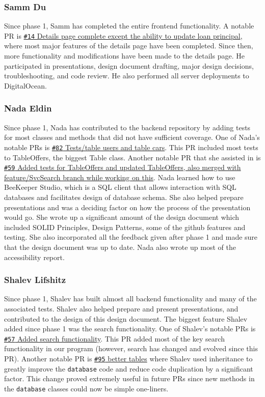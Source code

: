 \documentclass[fontsize=14pt]{article}
\def\code#1{\texttt{#1}}
\begin{document}
\subsubsection*{Samm Du}
Since phase 1, Samm has completed the entire frontend functionality. A notable PR is {\color{blue} \href{https://github.com/TLI-Group-1/Frontend/pull/14/}{\code{\#14} Details page complete except the ability to update loan principal}}, where most major features of the details page have been completed. Since then, more functionality and modifications have been made to the details page. He participated in presentations, design document drafting, major design decisions, troubleshooting, and code review. He also performed all server deployments to DigitalOcean.

\subsubsection*{Nada Eldin}
Since phase 1, Nada has contributed to the backend repository by adding tests for most classes and methods that did not have sufficient coverage. One of Nada's notable PRs is {\color{blue}\href{https://github.com/TLI-Group-1/Backend/pull/82}{\code{\#82} Tests/table users and table cars}}. This PR included most tests to TableOffers, the biggest Table class.
Another notable PR that she assisted in is {\color{blue}\href{https://github.com/TLI-Group-1/Backend/pull/59}{\code{\#59} Added tests for TableOffers and updated TableOffers, also merged with feature/SvcSearch branch while working on this}}.
Nada learned how to use BeeKeeper Studio, which is a SQL client that allows interaction with SQL databases and facilitates design of database schema. 
She also helped prepare presentations and was a deciding factor on how the process of the presentation would go. She wrote up a significant amount of the design document which included SOLID Principles, Design Patterns, some of the github features and testing. She also incorporated all the feedback given after phase 1 and made sure that the design document was up to date. Nada also wrote up most of the accessibility report.

\subsubsection*{Shalev Lifshitz}
Since phase 1, Shalev has built almost all backend functionality and many of the associated tests. Shalev also helped prepare and present presentations, and contributed to the design of this design document. The biggest feature Shalev added since phase 1 was the search functionality. One of Shalev's notable PRs is {\color{blue}\href{https://github.com/TLI-Group-1/Backend/pull/57/}{\code{\#57} Added search functionality}}. This PR added most of the key search functionality in our program (however, search has changed and evolved since this PR). Another notable PR is {\color{blue}\href{https://github.com/TLI-Group-1/Backend/pull/95/}{\code{\#95} better tables}} where Shalev used inheritance to greatly improve the \code{database} code and reduce code duplication by a significant factor. This change proved extremely useful in future PRs since new methods in the \code{database} classes  could now be simple one-liners. 
\end{document}
